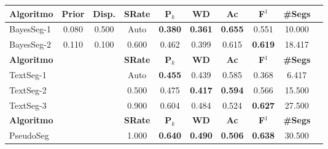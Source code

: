 \begin{table}[!h]
\begin{tabular}{|l||c|c|c|c|c|c|c|c|c|}
\hline
		\textbf{Algoritmo} &
		\textbf{Prior} &
		\textbf{Disp.} & 
		\textbf{SRate}& 
		\textbf{P$_k$} & 
		\textbf{WD} & 
		\textbf{Ac} & 
		\textbf{F$^1$} &
		\textbf{\#Segs} \\	\hline


 BayesSeg-1 & 0.080 & 0.500 &  Auto & \cellcolor{gray!20} \textbf{0.380} & \cellcolor{gray!20} \textbf{0.361} & \cellcolor{gray!20} \textbf{0.655} 
		  & 0.551 & 10.000  \\ \hline 
 BayesSeg-2 & 0.110 & 0.100 & 0.600 & 0.462 & 0.399 & 0.615 
		  & \cellcolor{gray!20} \textbf{0.619} & 18.417  \\ \hline 

\hline
		\textbf{Algoritmo} &&&
		\textbf{SRate} & 
		\textbf{P$_k$} & 
		\textbf{WD} & 
		\textbf{Ac} & 
		\textbf{F$^1$} &
		\textbf{\#Segs} \\	\hline

TextSeg-1 &&& Auto & \cellcolor{gray!20} \textbf{0.455} & 0.439 & 0.585 
		& 0.368 & 6.417  \\ \hline 
TextSeg-2 &&& 0.500 & 0.475 & \cellcolor{gray!20} \textbf{0.417} & \cellcolor{gray!20} \textbf{0.594} 
		& 0.566 & 15.500  \\ \hline 
TextSeg-3 &&& 0.900 & 0.604 & 0.484 & 0.524 
		& \cellcolor{gray!20} \textbf{0.627} & 27.500  \\ \hline 

\hline
		\textbf{Algoritmo} &&&
		\textbf{SRate} & 
		\textbf{P$_k$} & 
		\textbf{WD} & 
		\textbf{Ac} & 
		\textbf{F$^1$} &
		\textbf{\#Segs} \\	\hline


PseudoSeg &&& 1.000& \cellcolor{gray!20} \textbf{0.640} & \cellcolor{gray!20} \textbf{0.490} & \cellcolor{gray!20} \textbf{0.506} 
		   & \cellcolor{gray!20} \textbf{0.638} & 30.500  \\ \hline 



	\end{tabular}
\end{table}
